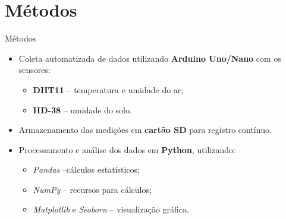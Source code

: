 \documentclass{beamer}
\begin{document}

\section{Métodos}
\begin{frame}{Métodos}
\begin{itemize}
    \item Coleta automatizada de dados utilizando \textbf{Arduino Uno/Nano} com os sensores:
    \begin{itemize}
        \item \textbf{DHT11} – temperatura e umidade do ar;
        \item \textbf{HD-38} – umidade do solo.
    \end{itemize}

    \item Armazenamento das medições em \textbf{cartão SD} para registro contínuo.

    \item Processamento e análise dos dados em \textbf{Python}, utilizando:
    \begin{itemize}
        \item \textit{Pandas} –cálculos estatísticos;
        \item \textit{NumPy} – recursos para cálculos;
        \item \textit{Matplotlib} e \textit{Seaborn} – visualização gráfica.
    \end{itemize}
\end{itemize}
\end{frame}
\end{document}
